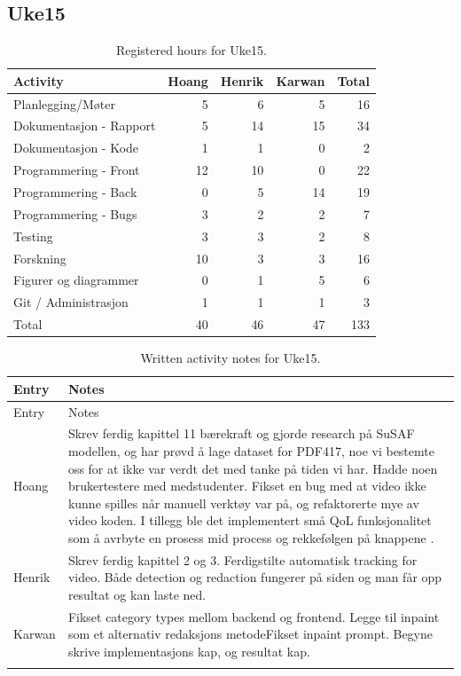 \subsection{Uke15}

\begin{table}[H]
\centering
\small
\caption{Registered hours for Uke15.}
\label{tab:project-hours-uke15}
\begin{tabular}{lrrrr}
\toprule
Activity & Hoang & Henrik & Karwan & Total \\
\midrule
Planlegging/Møter & 5 & 6 & 5 & 16 \\
Dokumentasjon - Rapport & 5 & 14 & 15 & 34 \\
Dokumentasjon - Kode & 1 & 1 & 0 & 2 \\
Programmering - Front & 12 & 10 & 0 & 22 \\
Programmering - Back & 0 & 5 & 14 & 19 \\
Programmering - Bugs & 3 & 2 & 2 & 7 \\
Testing & 3 & 3 & 2 & 8 \\
Forskning & 10 & 3 & 3 & 16 \\
Figurer og diagrammer & 0 & 1 & 5 & 6 \\
Git / Administrasjon & 1 & 1 & 1 & 3 \\
\midrule
Total & 40 & 46 & 47 & 133 \\
\bottomrule
\end{tabular}
\end{table}

\begin{longtable}{p{}p{}}
\caption{Written activity notes for Uke15.}\\
\toprule
Entry & Notes \\
\midrule
\endfirsthead
\toprule
Entry & Notes \\
\midrule
\endhead
Hoang & Skrev ferdig kapittel 11 bærekraft og gjorde research på SuSAF modellen, og har prøvd å lage dataset for PDF417, noe vi bestemte oss for at ikke var verdt det med tanke på tiden vi har. Hadde noen brukertestere med medstudenter. Fikset en bug med at video ikke kunne spilles når manuell verktøy var på, og refaktorerte mye av video koden. I tillegg ble det implementert små QoL funksjonalitet som å avrbyte en prosess mid process og rekkefølgen på knappene . \\
\addlinespace
Henrik & Skrev ferdig kapittel 2 og 3. Ferdigstilte automatisk tracking for video. Både detection og redaction fungerer på siden og man får opp resultat og kan laste ned. \\
\addlinespace
Karwan & Fikset category types mellom backend og frontend. Legge til inpaint som et alternativ redaksjons metode\newline Fikset inpaint prompt. Begyne skrive implementasjons kap, og resultat kap. \\
\addlinespace
\bottomrule
\end{longtable}

